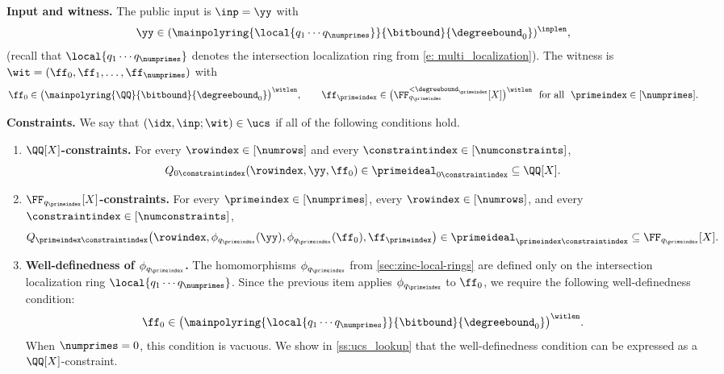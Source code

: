 \begin{definition}
\smallskip\noindent\textbf{Input and witness.}
The public input is $\inp=\yy$ with
\[
\yy\in (\mainpolyring{\local{q_1\cdots q_{\numprimes}}}{\bitbound}{\degreebound_0})^{\inplen},
\] 
(recall that $\local{q_1\cdots q_{\numprimes}}$ denotes the intersection localization ring from \cref{e: multi_localization}).
The witness is $\wit=(\ff_0,\ff_1,\ldots,\ff_{\numprimes})$ with
\begin{equation}\label{eq:witness_typing}
\ff_0\in\bigl(\mainpolyring{\QQ}{\bitbound}{\degreebound_0}\bigr)^{\witlen},
\qquad
\ff_{\primeindex}\in\bigl(\FF_{q_\primeindex}^{<\degreebound_\primeindex}[X]\bigr)^{\witlen}\ \text{ for all }\ \primeindex\in[\numprimes].
\end{equation}

\smallskip\noindent\textbf{Constraints.}
We say that $(\idx,\inp;\wit)\in\ucs$ if all of the following conditions hold.

\begin{enumerate}[label=(\roman*),leftmargin=*,itemsep=2pt]
\item \textbf{$\QQ[X]$-constraints.}
For every $\rowindex\in[\numrows]$ and every $\constraintindex\in[\numconstraints]$,
\[
Q_{0\constraintindex}(\rowindex,\yy,\ff_0)\in \primeideal_{0\constraintindex}\subseteq \QQ[X].
\]

\item \textbf{$\FF_{q_\primeindex}[X]$-constraints.}
For every $\primeindex\in[\numprimes]$, every $\rowindex\in[\numrows]$, and every
$\constraintindex\in[\numconstraints]$,
\[
Q_{\primeindex\constraintindex}\bigl(\rowindex,\phi_{q_\primeindex}(\yy),\phi_{q_\primeindex}(\ff_0),\ff_{\primeindex}\bigr)
\in \primeideal_{\primeindex\constraintindex}\subseteq \FF_{q_\primeindex}[X].
\]

\item \textbf{Well-definedness of $\phi_{q_\primeindex}$.}
The homomorphisms $\phi_{q_\primeindex}$ from \cref{sec:zinc-local-rings} are defined only on the
intersection localization ring $\local{q_1\cdots q_{\numprimes}}$. Since the previous item applies
$\phi_{q_\primeindex}$ to $\ff_0$, we require the following well-definedness condition:
\begin{equation}\label{eq:ucs_welldefinedness}
\ff_0\in\bigl(\mainpolyring{\local{q_1\cdots q_{\numprimes}}}{\bitbound}{\degreebound_0}\bigr)^{\witlen}.
\end{equation}
When $\numprimes=0$, this condition is vacuous. We show in \cref{ss:ucs_lookup} that the well-definedness condition can be expressed as a
$\QQ[X]$-constraint.
\end{enumerate}
\end{definition}

